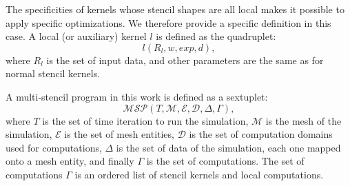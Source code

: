 The specificities of kernels whose stencil shapes are all local makes it possible to apply specific optimizations.
We therefore provide a specific definition in this case.
A local (or auxiliary) kernel $l$ is defined as the quadruplet:
\begin{equation} 
l(R_l,w,exp,d),
\label{eq:loc}
\end{equation}
where $R_l$ is the set of input data, and other parameters are the same as for normal stencil kernels.

A multi-stencil program in this work is defined as a sextuplet:
\begin{equation} 
\mathcal{MSP}(T,\mathcal{M},\mathcal{E},\mathcal{D},\Delta,\Gamma),
\label{eq:msp}
\end{equation}
where $T$ is the set of time iteration to run the simulation, $\mathcal{M}$ is the mesh of the simulation, $\mathcal{E}$ is the set of mesh entities, $\mathcal{D}$ is the set of computation domains used for computations, $\Delta$ is the set of data of the simulation, each one mapped onto a mesh entity, and finally $\Gamma$ is the set of computations. The set of computations $\Gamma$ is an ordered list of stencil kernels and local computations. 




